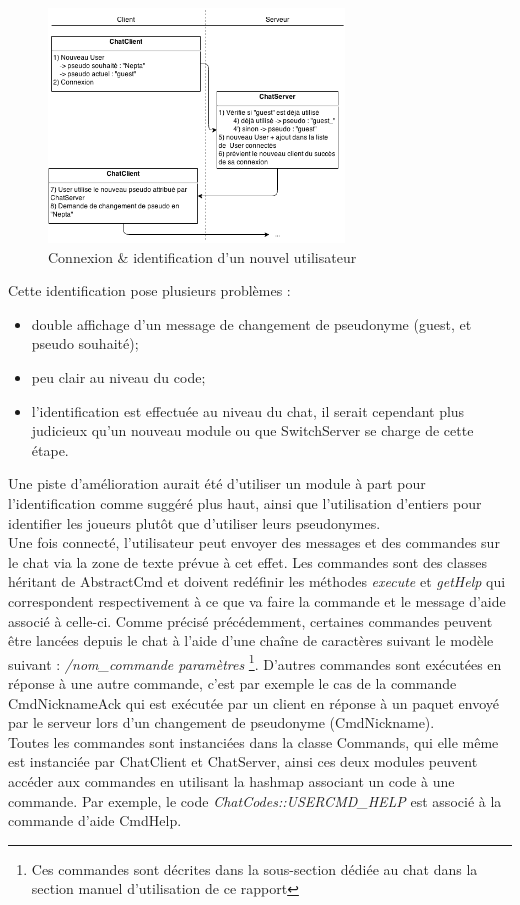 \begin{figure}[h!]
	\centering
	\includegraphics[width=0.7\textwidth]{img/chat_connection.png}
	\caption{Connexion \& identification d'un nouvel utilisateur}
\end{figure}

Cette identification pose plusieurs problèmes :
\begin{itemize}
	\item double affichage d'un message de changement de pseudonyme (guest, et pseudo souhaité);
	\item peu clair au niveau du code;
	\item l'identification est effectuée au niveau du chat, il serait cependant plus judicieux qu'un nouveau module ou que SwitchServer se charge de cette étape.
\end{itemize}

Une piste d'amélioration aurait été d'utiliser un module à part pour l'identification comme suggéré plus haut, ainsi que l'utilisation d'entiers pour identifier les joueurs plutôt que d'utiliser leurs pseudonymes.\\

Une fois connecté, l'utilisateur peut envoyer des messages et des commandes sur le chat via la zone de texte prévue à cet effet. Les commandes sont des classes héritant de AbstractCmd et doivent redéfinir les méthodes \emph{execute} et \emph{getHelp} qui correspondent respectivement à ce que va faire la commande et le message d'aide associé à celle-ci. Comme précisé précédemment, certaines commandes peuvent être lancées depuis le chat à l'aide d'une chaîne de caractères suivant le modèle suivant : \emph{/nom\_commande paramètres} \footnote{Ces commandes sont décrites dans la sous-section dédiée au chat dans la section manuel d'utilisation de ce rapport}. D'autres commandes sont exécutées en réponse à une autre commande, c'est par exemple le cas de la commande CmdNicknameAck qui est exécutée par un client en réponse à un paquet envoyé par le serveur lors d'un changement de pseudonyme (CmdNickname).\\

Toutes les commandes sont instanciées dans la classe Commands, qui elle même est instanciée par ChatClient et ChatServer, ainsi ces deux modules peuvent accéder aux commandes en utilisant la hashmap associant un code à une commande. Par exemple, le code \emph{ChatCodes::USERCMD\_HELP} est associé à la commande d'aide CmdHelp.\\